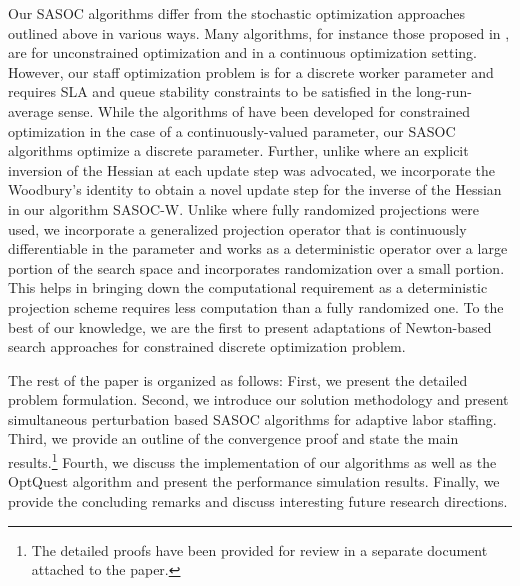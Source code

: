 \documentclass[11pt,letterpaper,english]{article}
\begin{document}
Our SASOC algorithms differ from the stochastic optimization
approaches outlined above in various ways. Many algorithms, for
instance those proposed in
\citep{spall2000adaptive,bhatnagar2005adaptive,bhatnagar2007adaptive},
are for unconstrained optimization and in a continuous optimization setting.
However, our staff optimization
problem is for a discrete worker parameter and requires SLA and queue stability constraints to be
satisfied in the long-run-average sense.
While the algorithms of \citep{shalabh2011constrained} have
been developed for constrained optimization in the case of a continuously-valued parameter, our SASOC
algorithms optimize a discrete parameter. Further, unlike
\citep{shalabh2011constrained} where an explicit inversion of the Hessian at each
update step was advocated, we incorporate the Woodbury's identity to obtain a
novel update step for the inverse of the Hessian in our algorithm SASOC-W.
Unlike \citep{shalabh2011stochastic} where fully randomized projections were
used, we incorporate a generalized projection operator that is continuously
differentiable in the parameter and works as a deterministic operator over a
large portion of the search space and incorporates randomization over a small
portion. This helps in bringing down the computational requirement as a
deterministic projection scheme requires less computation than a fully
randomized one.
To the best of our knowledge, we are the first to present adaptations of Newton-based search approaches for constrained discrete optimization problem. 

The rest of the paper is organized as follows: First, we present the detailed problem formulation.
Second, we introduce our solution methodology and present 
simultaneous perturbation based SASOC algorithms for adaptive labor staffing. 
Third, we provide an outline of the convergence proof
and state the main results.\footnote{The detailed proofs have been provided
for review in a separate document attached to the paper.}
Fourth, we discuss the
implementation of our algorithms as well as the OptQuest algorithm and
present the performance simulation results. Finally, we provide the concluding remarks and discuss interesting future research directions.  
\end{document}

